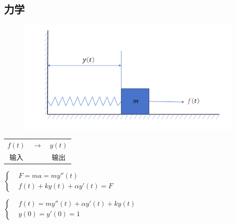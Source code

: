 \documentclass[UTF8]{ctexart}
\begin{document}
\subsection{力学}
\begin{figure}[h]
      \centering
      \includegraphics[scale=0.35]{力学.png}
\end{figure}
\begin{center}
      \begin{tabular}{ c c c }
            $f(t)$ & $\rightarrow$ & $y(t)$ \\
            输入 & $\quad$ & 输出
      \end{tabular}
\end{center} \par
$\left\{
      \begin{aligned}
            &F=ma=my''(t) \\
            &f(t)+ky(t)+\alpha{y'(t)}=F
      \end{aligned}
\right.$ \par
$\left\{
      \begin{aligned}
            &f(t)=my''(t)+\alpha{y'(t)}+ky(t) \\
            &y(0)=y'(0)=1
      \end{aligned}
\right.$ \par
\end{document}
